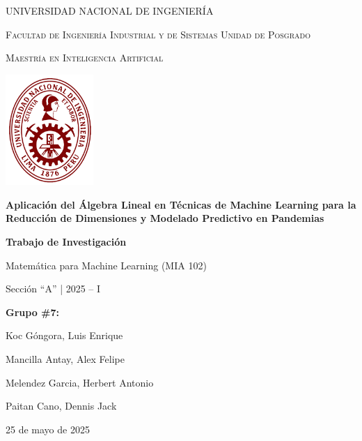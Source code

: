\documentclass[12pt]{article}
\begin{document}
        
        \begin{titlepage}
                \centering
                {\scshape\Large UNIVERSIDAD NACIONAL DE INGENIERÍA \par}
                {\scshape\large Facultad de Ingeniería Industrial y de Sistemas Unidad de Posgrado \par}
                {\scshape\large Maestría en Inteligencia Artificial \par}
                \vspace{2cm}
                
                \includegraphics[width=0.25\textwidth]{imagenes/logo.png}\par\vspace{1cm}
                
                {\Huge\bfseries Aplicación del Álgebra Lineal en Técnicas de Machine Learning para la Reducción de Dimensiones y Modelado Predictivo en Pandemias \par}
                \vspace{1.5cm}
                {\large\bfseries Trabajo de Investigación \par}
                \vspace{0.5cm}
                {\large Matemática para Machine Learning (MIA 102) \par}
                {\large Sección “A” | 2025 – I \par}
                \vspace{0.5cm}
                {\large\bfseries Grupo \#7: \par}
                \vspace{0.5cm}
                {\large Koc Góngora, Luis Enrique \par}
                {\large Mancilla Antay, Alex Felipe \par}
                {\large Melendez Garcia, Herbert Antonio \par}
                {\large Paitan Cano, Dennis Jack \par}
                \vfill
                {\large 25 de mayo de 2025 \par}
        \end{titlepage}
        
\end{document}
